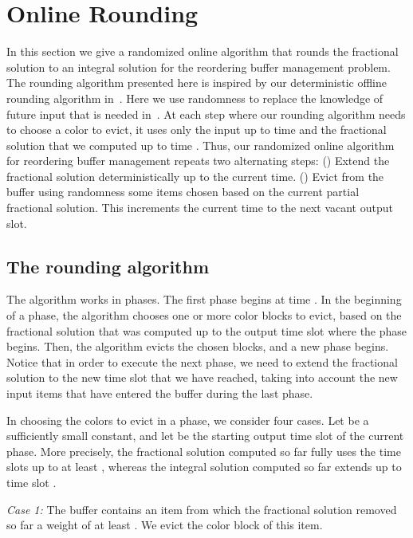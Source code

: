 \documentclass[12pt]{article}
\begin{document}
\section{Online Rounding}\label{sec: online rounding}

In this section we give a randomized online algorithm that
rounds the fractional solution  to an integral solution
for the reordering buffer management problem.
The rounding algorithm presented here is inspired
by our deterministic offline rounding algorithm in~\cite{AR13}.
Here we use randomness to replace the knowledge of future
input that is needed in~\cite{AR13}. 
At each
step  where our rounding algorithm needs to choose a
color to evict, it uses only the input up to time  and the 
fractional solution  that we computed up to time . 
Thus, our randomized online algorithm for reordering buffer 
management repeats two alternating steps: () Extend the 
fractional solution deterministically up to the current time. 
() Evict from the buffer using randomness some items 
chosen based on the current partial fractional solution. This 
increments the current time to the next vacant output slot.



\subsection{The rounding algorithm}

The algorithm works in phases. The first phase begins at
time . In the beginning of a phase, the algorithm
chooses one or more color blocks to evict, based on the 
fractional
solution  that was computed up to the output time
slot  where the phase begins. Then, the algorithm 
evicts the chosen
blocks, and a new phase begins. Notice that
in order to execute the next phase, we need to extend
the fractional solution  to the new time slot that we 
have reached, taking into account the new input items 
that have entered the buffer during the last phase.

In choosing the colors to evict in a phase, we consider
four cases. Let  be a sufficiently small constant, 
and let  be the starting output time slot of the current 
phase. More precisely, the fractional solution computed so
far fully uses the time slots up to at least , whereas the 
integral solution computed so far extends up to time slot 
.

{\em Case 1:}\/ The buffer contains an item from which 
the fractional solution removed so far a weight of at least 
. We evict the color block of this item.
\end{document}
